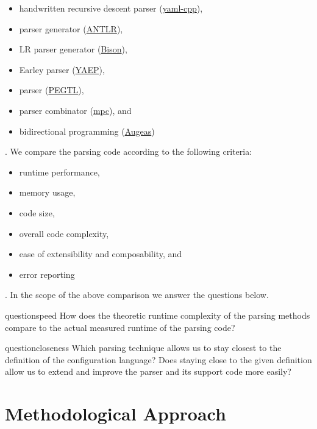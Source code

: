 \begin{itemize}
  \item handwritten recursive descent parser (\href{https://github.com/jbeder/yaml-cpp}{yaml-cpp}),
  \item {} parser generator (\href{http://www.antlr.org}{ANTLR}),
  \item LR parser generator (\href{https://www.gnu.org/software/bison}{Bison}),
  \item Earley parser (\href{https://github.com/vnmakarov/yaep}{YAEP}),
  \item {} parser (\href{https://github.com/taocpp/PEGTL}{PEGTL}),
  \item parser combinator (\href{https://github.com/orangeduck/mpc}{mpc}), and
  \item bidirectional programming (\href{http://augeas.net}{Augeas})
\end{itemize}

. We compare the parsing code according to the following criteria:

\begin{itemize}
  \item runtime performance,
  \item memory usage,
  \item code size,
  \item overall code complexity,
  \item ease of extensibility and composability, and
  \item error reporting
\end{itemize}

. In the scope of the above comparison we answer the questions below.

\begin{restatable}{question}{speed}
  \label{que:speed}
  How does the theoretic runtime complexity of the parsing methods compare to the actual measured runtime of the parsing code?
\end{restatable}

\begin{restatable}{question}{closeness}
  \label{que:closeness}
  Which parsing technique allows us to stay closest to the definition of the configuration language? Does staying close to the given definition
  allow us to extend and improve the parser and its support code more easily?
\end{restatable}

\section{Methodological Approach}

